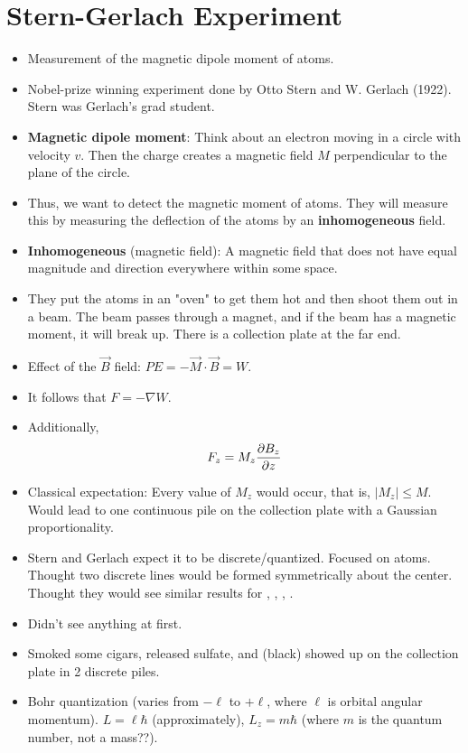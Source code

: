 \documentclass[../notes.tex]{subfiles}
\begin{document}
\section{Stern-Gerlach Experiment}
\begin{itemize}
    \item {}Measurement of the magnetic dipole moment of atoms.
    \item Nobel-prize winning experiment done by Otto Stern and W. Gerlach (1922). Stern was Gerlach's grad student.
    \item \textbf{Magnetic dipole moment}: Think about an electron moving in a circle with velocity $v$. Then the charge creates a magnetic field $M$ perpendicular to the plane of the circle.
    \item Thus, we want to detect the magnetic moment of atoms. They will measure this by measuring the deflection of the atoms by an \textbf{inhomogeneous} field.
    \item \textbf{Inhomogeneous} (magnetic field): A magnetic field that does not have equal magnitude and direction everywhere within some space.
    \item They put the atoms in an "oven" to get them hot and then shoot them out in a beam. The beam passes through a magnet, and if the beam has a magnetic moment, it will break up. There is a collection plate at the far end.
    \item Effect of the $\vec{B}$ field: $PE=-\vec{M}\cdot\vec{B}=W$.
    \item It follows that $F=-\nabla W$.
    \item Additionally,
    \begin{equation*}
        F_z = M_z\pdv{B_z}{z}
    \end{equation*}
    \item Classical expectation: Every value of $M_z$ would occur, that is, $|M_z|\leq M$. Would lead to one continuous pile on the collection plate with a Gaussian proportionality.
    \item Stern and Gerlach expect it to be discrete/quantized. Focused on  atoms. Thought two discrete lines would be formed symmetrically about the center. Thought they would see similar results for , , , .
    \item Didn't see anything at first.
    \item Smoked some cigars, released sulfate, and  (black) showed up on the collection plate in 2 discrete piles.
    \item Bohr quantization (varies from $-\ell$ to $+\ell$, where $\ell$ is orbital angular momentum). $L=\ell\hbar$ (approximately), $L_z=m\hbar$ (where $m$ is the quantum number, not a mass??).

\end{itemize}
\end{document}
